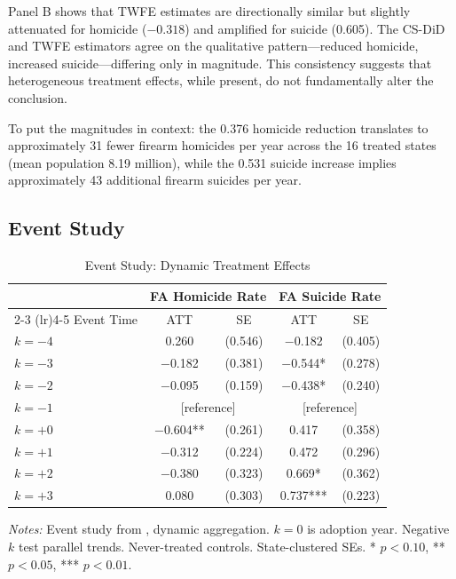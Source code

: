 \documentclass[12pt]{article}
\begin{document}
Panel B shows that TWFE estimates are directionally similar but slightly attenuated for homicide ($-0.318$) and amplified for suicide (0.605). The CS-DiD and TWFE estimators agree on the qualitative pattern---reduced homicide, increased suicide---differing only in magnitude. This consistency suggests that heterogeneous treatment effects, while present, do not fundamentally alter the conclusion.

To put the magnitudes in context: the 0.376 homicide reduction translates to approximately 31 fewer firearm homicides per year across the 16 treated states (mean population 8.19 million), while the 0.531 suicide increase implies approximately 43 additional firearm suicides per year.

\subsection{Event Study}

\begin{table}[H]
\centering
\caption{Event Study: Dynamic Treatment Effects}
\begin{threeparttable}
\begin{tabular}{lcccc}
\toprule
& \multicolumn{2}{c}{FA Homicide Rate} & \multicolumn{2}{c}{FA Suicide Rate} \\
\cmidrule(lr){2-3} \cmidrule(lr){4-5}
Event Time & ATT & SE & ATT & SE \\
\midrule
$k = -4$ & 0.260 & (0.546) & $-$0.182 & (0.405) \\
$k = -3$ & $-$0.182 & (0.381) & $-$0.544* & (0.278) \\
$k = -2$ & $-$0.095 & (0.159) & $-$0.438* & (0.240) \\
$k = -1$ & \multicolumn{2}{c}{[reference]} & \multicolumn{2}{c}{[reference]} \\
$k = +0$ & $-$0.604** & (0.261) & 0.417 & (0.358) \\
$k = +1$ & $-$0.312 & (0.224) & 0.472 & (0.296) \\
$k = +2$ & $-$0.380 & (0.323) & 0.669* & (0.362) \\
$k = +3$ & 0.080 & (0.303) & 0.737*** & (0.223) \\
\bottomrule
\end{tabular}
\begin{tablenotes}[flushleft]
\small
\item \textit{Notes:} Event study from \citet{callaway2021}, dynamic aggregation. $k=0$ is adoption year. Negative $k$ test parallel trends. Never-treated controls. State-clustered SEs. * $p<0.10$, ** $p<0.05$, *** $p<0.01$.
\end{tablenotes}
\end{threeparttable}
\label{tab:eventstudy}
\end{table}
\end{document}
